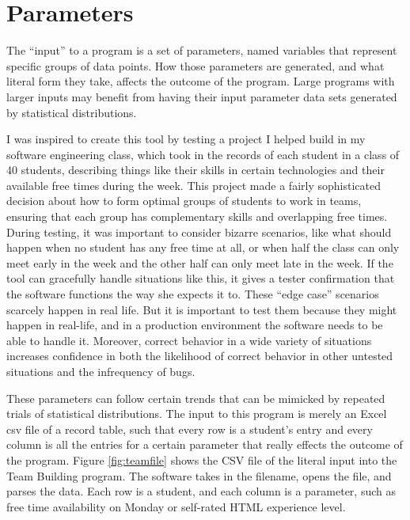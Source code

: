 \section{Parameters}
The ``input'' to a program is a set of parameters, named variables that represent specific groups of data points. How those parameters are generated, and what literal form they take, affects the outcome of the program. Large programs with larger inputs may benefit from having their input parameter data sets generated by statistical distributions.

I was inspired to create this tool by testing a project I helped build in my software engineering class, which took in the records of each student in a class of 40 students, describing things like their skills in certain technologies and their available free times during the week. This project made a fairly sophisticated decision about how to form optimal groups of students to work in teams, ensuring that each group has complementary skills and overlapping free times. During testing, it was important to consider bizarre scenarios, like what should happen when no student has any free time at all, or when half the class can only meet early in the week and the other half can only meet late in the week. If the tool can gracefully handle situations like this, it gives a tester confirmation that the software functions the way she expects it to. These ``edge case'' scenarios scarcely happen in real life. But it is important to test them because they might happen in real-life, and in a production environment the software needs to be able to handle it. Moreover, correct behavior in a wide variety of situations increases confidence in both the likelihood of correct behavior in other untested situations and the infrequency of bugs.

These parameters can follow certain trends that can be mimicked by repeated trials of statistical distributions. The input to this program is merely an Excel csv file of a record table, such that every row is a student's entry and every column is all the entries for a certain parameter that really effects the outcome of the program. Figure \ref{fig:teamfile} shows the CSV file of the literal input into the Team Building program. The software takes in the filename, opens the file, and parses the data. Each row is a student, and each column is a parameter, such as free time availability on Monday or self-rated HTML experience level.

